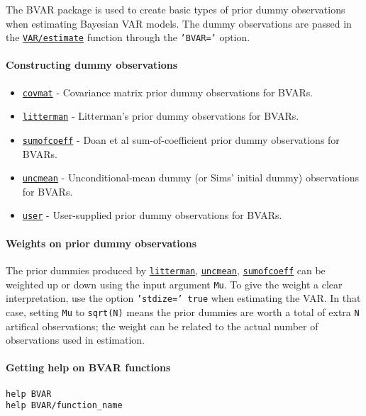 

	The BVAR package is used to create basic types of prior dummy
observations when estimating Bayesian VAR models. The dummy observations
are passed in the \href{VAR/estimate}{\texttt{VAR/estimate}} function
through the \texttt{'BVAR='} option.

\paragraph{Constructing dummy
observations}\label{constructing-dummy-observations}

\begin{itemize}
\itemsep1pt\parskip0pt
\item
  \href{BVAR/covmat}{\texttt{covmat}} - Covariance matrix prior dummy
  observations for BVARs.
\item
  \href{BVAR/litterman}{\texttt{litterman}} - Litterman's prior dummy
  observations for BVARs.
\item
  \href{BVAR/sumofcoeff}{\texttt{sumofcoeff}} - Doan et al
  sum-of-coefficient prior dummy observations for BVARs.
\item
  \href{BVAR/uncmean}{\texttt{uncmean}} - Unconditional-mean dummy (or
  Sims' initial dummy) observations for BVARs.
\item
  \href{BVAR/user}{\texttt{user}} - User-supplied prior dummy
  observations for BVARs.
\end{itemize}

\paragraph{Weights on prior dummy
observations}\label{weights-on-prior-dummy-observations}

The prior dummies produced by \href{BVAR/litterman}{\texttt{litterman}},
\href{BVAR/uncmean}{\texttt{uncmean}},
\href{BVAR/sumofcoeff}{\texttt{sumofcoeff}} can be weighted up or down
using the input argument \texttt{Mu}. To give the weight a clear
interpretation, use the option \texttt{'stdize=' true} when estimating
the VAR. In that case, setting \texttt{Mu} to \texttt{sqrt(N)} means the
prior dummies are worth a total of extra \texttt{N} artifical
observations; the weight can be related to the actual number of
observations used in estimation.

\paragraph{Getting help on BVAR
functions}\label{getting-help-on-bvar-functions}

\begin{verbatim}
help BVAR
help BVAR/function_name
\end{verbatim}



